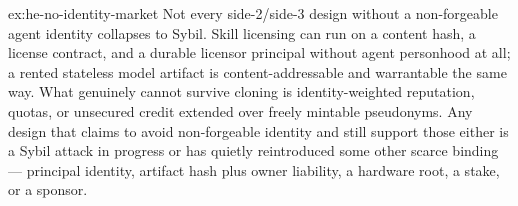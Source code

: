 \documentclass[11pt,a4paper]{article}
\theoremstyle{definition}
\theoremstyle{definition}
\theoremstyle{remark}
\begin{document}
\begin{pdsolution}{ex:he-no-identity-market}
Not every side-2/side-3 design without a
non-forgeable agent identity collapses to Sybil. Skill licensing can run on a
content hash, a license contract, and a durable licensor principal without agent
personhood at all; a rented stateless model artifact is content-addressable and
warrantable the same way. What genuinely cannot survive cloning is
identity-weighted reputation, quotas, or unsecured credit extended over freely
mintable pseudonyms. Any design that claims to avoid non-forgeable identity and
still support those either is a Sybil attack in progress or has quietly
reintroduced some other scarce binding --- principal identity, artifact hash plus
owner liability, a hardware root, a stake, or a sponsor.
\end{pdsolution}

\end{document}

